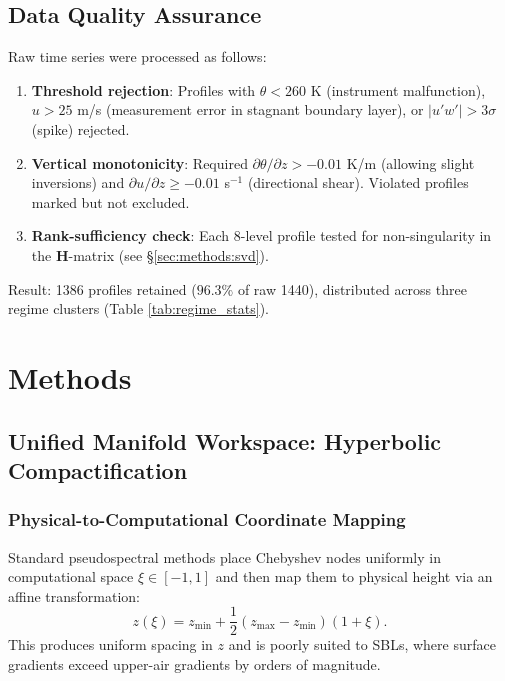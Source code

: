 \documentclass[11pt,a4paper]{article}
\begin{document}
\subsection{Data Quality Assurance}

Raw time series were processed as follows:
\begin{enumerate}
  \item \textbf{Threshold rejection}: Profiles with $\theta < 260$ K (instrument malfunction), $u > 25$ m/s (measurement error in stagnant boundary layer), or $|u'w'| > 3\sigma$ (spike) rejected.
  \item \textbf{Vertical monotonicity}: Required $\partial \theta / \partial z > -0.01$ K/m (allowing slight inversions) and $\partial u / \partial z \geq -0.01$ s$^{-1}$ (directional shear). Violated profiles marked but not excluded.
  \item \textbf{Rank-sufficiency check}: Each 8-level profile tested for non-singularity in the $\mathbf{H}$-matrix (see \S\ref{sec:methods:svd}).
\end{enumerate}

Result: 1386 profiles retained ($96.3\%$ of raw 1440), distributed across three regime clusters (Table \ref{tab:regime_stats}).

\section{Methods}
\label{sec:methods}

\subsection{Unified Manifold Workspace: Hyperbolic Compactification}
\label{sec:methods:manifold}

\subsubsection{Physical-to-Computational Coordinate Mapping}

Standard pseudospectral methods place Chebyshev nodes uniformly in computational space $\xi \in [-1, 1]$ and then map them to physical height via an affine transformation:
\begin{equation}
z(\xi) = z_{\min} + \frac{1}{2}(z_{\max} - z_{\min})(1 + \xi).
\end{equation}
This produces uniform spacing in $z$ and is poorly suited to SBLs, where surface gradients exceed upper-air gradients by orders of magnitude.
\end{document}
